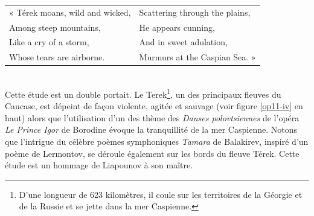 \begin{tabular}{ll}
\hspace{-3.9mm}« Térek moans, wild and wicked,
&
Scattering through the plains,
\\
Among steep mountains,
&
He appears cunning,
\\
Like a cry of a storm,
&
And in sweet adulation,
\\
Whose tears are airborne.
&
Murmurs at the Caspian Sea. »
\end{tabular}\\

Cette étude est un double portait. Le Terek\footnote{D'une longueur de 623 kilomètres, il coule sur les territoires de la Géorgie et de la Russie et se jette dans la mer Caspienne.}, un des principaux fleuves du Caucase, est dépeint de façon violente, agitée et sauvage (voir figure \ref{op11-iv} en haut) alors que l'utilisation d'un des thème des \emph{Danses polovtsiennes} de l'opéra \emph{Le Prince Igor} de Borodine évoque la tranquillité de la mer Caspienne. Notons que l'intrigue du célèbre poèmes symphoniques \emph{Tamara} de Balakirev, inspiré d'un poème de Lermontov, se déroule également sur les bords du fleuve Térek. Cette étude est un hommage de Liapounov à son maître.

